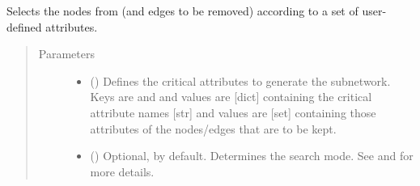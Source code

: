 \documentclass[letterpaper,10pt,english]{sphinxmanual}
\begin{document}
\begin{fulllineitems}

\begin{fulllineitems}
\label{\detokenize{main:pypath.main.PyPath.get_nodes_d}}
\end{fulllineitems}


\begin{fulllineitems}
\label{\detokenize{main:pypath.main.PyPath.get_pathways}}
\end{fulllineitems}


\begin{fulllineitems}
\label{\detokenize{main:pypath.main.PyPath.get_proteomicsdb}}
\end{fulllineitems}


\begin{fulllineitems}
\label{\detokenize{main:pypath.main.PyPath.get_sub}}
Selects the nodes from  (and edges to be removed)
according to a set of user-defined attributes.
\begin{quote}\begin{description}
\item[{Parameters}] \leavevmode\begin{itemize}
\item {} 
 () \textendash{} Defines the critical attributes to generate the subnetwork.
Keys are  and  and values are {[}dict{]}
containing the critical attribute names {[}str{]} and values
are {[}set{]} containing those attributes of the nodes/edges
that are to be kept.

\item {} 
 () \textendash{} Optional,  by default. Determines the search mode.
See {\hyperref[\detokenize{main:pypath.main.PyPath.search_attr_or}]{}} and
{\hyperref[\detokenize{main:pypath.main.PyPath.search_attr_and}]{}} for more
details.


\end{itemize}
\end{description}
\end{quote}
\end{fulllineitems}
\end{fulllineitems}
\end{document}
